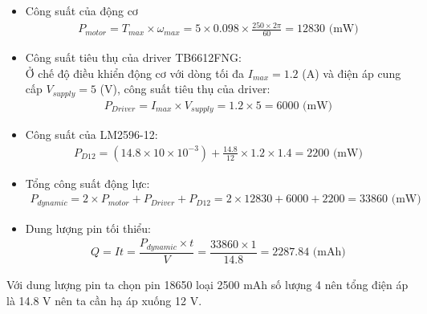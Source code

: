                 \begin{itemize}
                    \item Công suất của động cơ
                    \begin{align}
                       P_{motor} = T_{max} \times \omega_{max} = 5 \times 0.098 \times \frac{250 \times 2\pi}{60} = 12830 \text{ (mW)}
                    \end{align}
                    \item Công suất tiêu thụ của driver TB6612FNG: \\
                    Ở chế độ điều khiển động cơ với dòng tối đa $I_{max} = 1.2$ (A) và điện áp cung cấp $V_{supply} = 5$ (V), công suất tiêu thụ của driver:
                    \begin{align}
                        P_{Driver} = I_{max} \times V_{supply} = 1.2 \times 5 = 6000 \text{ (mW)}
                    \end{align}
                    \item Công suất của LM2596-12:
                    \begin{align}
                        P_{D12} = (14.8 \times 10 \times 10^{-3}) + \frac{14.8}{12} \times 1.2 \times 1.4 = 2200 \text{ (mW)}
                    \end{align}
                    \item Tổng công suất động lực:
                    \begin{align}
                        P_{dynamic} = 2 \times P_{motor} + P_{Driver} + P_{D12} = 2 \times 12830 + 6000 + 2200 = 33860 \text{ (mW)}
                    \end{align}
                    \item Dung lượng pin tối thiểu:
                    \begin{align}
                        Q = It = \dfrac{P_{dynamic} \times t}{V} = \dfrac{33860 \times 1}{14.8} = 2287.84 \text{ (mAh)}
                    \end{align}
                \end{itemize}
                \hspace*{0.6cm}Với dung lượng pin ta chọn pin 18650 loại 2500 mAh số lượng 4 nên tổng điện áp là 14.8 V nên ta cần hạ áp xuống 12 V.
